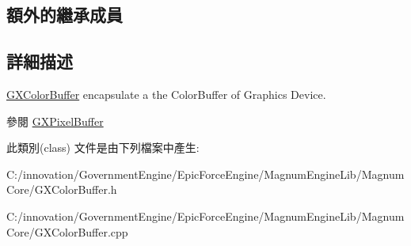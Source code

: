 \subsection*{額外的繼承成員}


\subsection{詳細描述}
\hyperlink{class_i_dream_sky_1_1_g_x_color_buffer}{G\+X\+Color\+Buffer} encapsulate a the Color\+Buffer of Graphics Device. 

\begin{DoxySeeAlso}{參閱}
\hyperlink{class_i_dream_sky_1_1_g_x_pixel_buffer}{G\+X\+Pixel\+Buffer} 
\end{DoxySeeAlso}


此類別(class) 文件是由下列檔案中產生\+:\begin{DoxyCompactItemize}
\item 
C\+:/innovation/\+Government\+Engine/\+Epic\+Force\+Engine/\+Magnum\+Engine\+Lib/\+Magnum\+Core/G\+X\+Color\+Buffer.\+h\item 
C\+:/innovation/\+Government\+Engine/\+Epic\+Force\+Engine/\+Magnum\+Engine\+Lib/\+Magnum\+Core/G\+X\+Color\+Buffer.\+cpp\end{DoxyCompactItemize}
